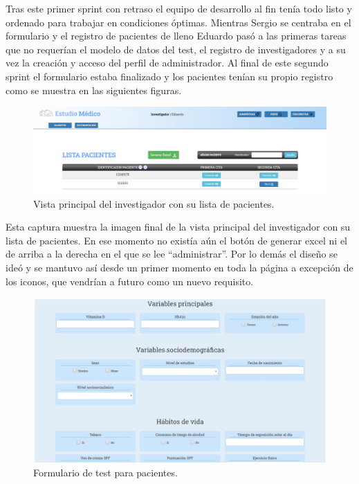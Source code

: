 Tras este primer sprint con retraso el equipo de desarrollo al fin tenía todo listo y ordenado para trabajar en condiciones óptimas. Mientras Sergio se centraba en el formulario y el registro de pacientes de lleno Eduardo pasó a las primeras tareas que no requerían el modelo de datos del test, el registro de investigadores y a su vez la creación y acceso del perfil de administrador. Al final de este segundo sprint el formulario estaba finalizado y los pacientes tenían su propio registro como se muestra en las siguientes figuras.
\newline

 \begin{figure}[h]
    \centering
     \includegraphics[width=1\textwidth]{images/investigadorPacientes.jpg}
    \caption{Vista principal del investigador con su lista de pacientes.}
\end{figure}

Esta captura muestra la imagen final de la vista principal del investigador con su lista de pacientes. En ese momento no existía aún el botón de generar excel ni el de arriba a la derecha en el que se lee ``administrar''. Por lo demás el diseño se ideó y se mantuvo así desde un primer momento en toda la página a excepción de los iconos, que vendrían a futuro como un nuevo requisito.

\begin{figure}[h]
    \centering
     \includegraphics[width=1\textwidth]{images/testPacientes.jpg}
    \caption{Formulario de test para pacientes.}
\end{figure}

